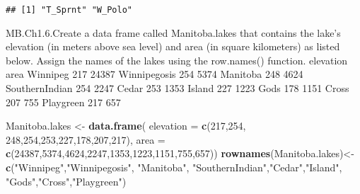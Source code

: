 \documentclass[
]{article}
\newenvironment{Shaded}{\begin{snugshade}}{\end{snugshade}}
\newcommand{\DataTypeTok}[1]{\textcolor[rgb]{0.13,0.29,0.53}{#1}}
\newcommand{\DecValTok}[1]{\textcolor[rgb]{0.00,0.00,0.81}{#1}}
\newcommand{\KeywordTok}[1]{\textcolor[rgb]{0.13,0.29,0.53}{\textbf{#1}}}
\newcommand{\NormalTok}[1]{#1}
\newcommand{\OperatorTok}[1]{\textcolor[rgb]{0.81,0.36,0.00}{\textbf{#1}}}
\newcommand{\StringTok}[1]{\textcolor[rgb]{0.31,0.60,0.02}{#1}}
\begin{document}
\begin{Shaded}
\end{Shaded}

\begin{verbatim}
## [1] "T_Sprnt" "W_Polo"
\end{verbatim}

MB.Ch1.6.Create a data frame called Manitoba.lakes that contains the
lake's elevation (in meters above sea level) and area (in square
kilometers) as listed below. Assign the names of the lakes using the
row.names() function. elevation area Winnipeg 217 24387 Winnipegosis 254
5374 Manitoba 248 4624 SouthernIndian 254 2247 Cedar 253 1353 Island 227
1223 Gods 178 1151 Cross 207 755 Playgreen 217 657

\begin{Shaded}
\begin{Highlighting}[]
\NormalTok{Manitoba.lakes <-}\StringTok{ }\KeywordTok{data.frame}\NormalTok{(}
                  \DataTypeTok{elevation =} \KeywordTok{c}\NormalTok{(}\DecValTok{217}\NormalTok{,}\DecValTok{254}\NormalTok{, }\DecValTok{248}\NormalTok{,}\DecValTok{254}\NormalTok{,}\DecValTok{253}\NormalTok{,}\DecValTok{227}\NormalTok{,}\DecValTok{178}\NormalTok{,}\DecValTok{207}\NormalTok{,}\DecValTok{217}\NormalTok{), }
                  \DataTypeTok{area =} \KeywordTok{c}\NormalTok{(}\DecValTok{24387}\NormalTok{,}\DecValTok{5374}\NormalTok{,}\DecValTok{4624}\NormalTok{,}\DecValTok{2247}\NormalTok{,}\DecValTok{1353}\NormalTok{,}\DecValTok{1223}\NormalTok{,}\DecValTok{1151}\NormalTok{,}\DecValTok{755}\NormalTok{,}\DecValTok{657}\NormalTok{))}
\KeywordTok{rownames}\NormalTok{(Manitoba.lakes)<-}\KeywordTok{c}\NormalTok{(}\StringTok{"Winnipeg"}\NormalTok{,}\StringTok{"Winnipegosis"}\NormalTok{, }\StringTok{"Manitoba"}\NormalTok{,}
                          \StringTok{"SouthernIndian"}\NormalTok{,}\StringTok{"Cedar"}\NormalTok{,}\StringTok{"Island"}\NormalTok{,}
                          \StringTok{"Gods"}\NormalTok{,}\StringTok{"Cross"}\NormalTok{,}\StringTok{"Playgreen"}\NormalTok{)}
\end{Highlighting}
\end{Shaded}
\end{document}
